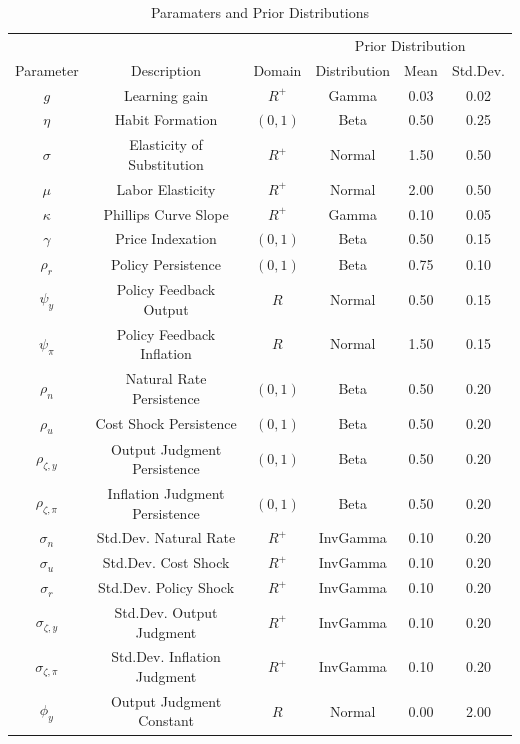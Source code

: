 \documentclass[12pt]{article}
\begin{document}
{\begin{table}\caption{Paramaters and Prior Distributions}
\begin{center}
\begin{tabular}{c|c|c||c|cc}
\multicolumn{3}{c}{} & \multicolumn{3}{c}{Prior Distribution} \\ 
Parameter & Description & Domain & Distribution & Mean & Std.Dev. \\ \hline 
$g$ & Learning gain & ${R}^{+}$ & Gamma & 0.03 & 0.02 \\ 
$\eta$ & Habit Formation & $(0,1)$ & Beta & 0.50 & 0.25 \\ 
$\sigma$ & Elasticity of Substitution & ${R}^{+}$ & Normal & 1.50 & 0.50 \\ 
$\mu$ & Labor Elasticity & ${R}^{+}$ & Normal & 2.00 & 0.50 \\ 
$\kappa$ & Phillips Curve Slope & ${R}^{+}$ & Gamma & 0.10 & 0.05 \\ 
$\gamma$ & Price Indexation & $(0,1)$ & Beta & 0.50 & 0.15 \\ 
$\rho_r$ & Policy Persistence & $(0,1)$ & Beta & 0.75 & 0.10 \\ 
$\psi_y$ & Policy Feedback Output & ${R}$ & Normal & 0.50 & 0.15 \\ 
$\psi_{\pi}$ & Policy Feedback Inflation & ${R}$ & Normal & 1.50 & 0.15 \\ 
$\rho_n$ & Natural Rate Persistence & $(0,1)$ & Beta & 0.50 & 0.20 \\ 
$\rho_u$ & Cost Shock Persistence & $(0,1)$ & Beta & 0.50 & 0.20 \\ 
$\rho_{\zeta,y}$ & Output Judgment Persistence & $(0,1)$ & Beta & 0.50 & 0.20 \\ 
$\rho_{\zeta,\pi}$ & Inflation Judgment Persistence & $(0,1)$ & Beta & 0.50 & 0.20 \\ 
$\sigma_{n}$ & Std.Dev. Natural Rate & ${R}^{+}$ & InvGamma & 0.10 & 0.20 \\ 
$\sigma_{u}$ & Std.Dev. Cost Shock & ${R}^{+}$ & InvGamma & 0.10 & 0.20 \\ 
$\sigma_{r}$ & Std.Dev. Policy Shock & ${R}^{+}$ & InvGamma & 0.10 & 0.20 \\ 
$\sigma_{\zeta,y}$ & Std.Dev. Output Judgment & ${R}^{+}$ & InvGamma & 0.10 & 0.20 \\ 
$\sigma_{\zeta,\pi}$ & Std.Dev. Inflation Judgment & ${R}^{+}$ & InvGamma & 0.10 & 0.20 \\ 
$\phi_{y}$ & Output Judgment Constant& ${R}$ & Normal & 0.00 & 2.00 \\ 

\end{tabular}
\end{center}
\end{table}}
\end{document}
